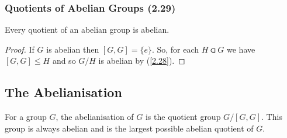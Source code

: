 \subsubsection{Quotients of Abelian Groups (2.29)} \label{2.29}

Every quotient of an abelian group is abelian.

\begin{proof}
    If $G$ is abelian then $[G, G] = \{e\}$. So, for each $H \csub G$
    we have $[G, G] \leq H$ and so $G / H$ is abelian by (\ref{2.28}).
\end{proof}

\subsection{The Abelianisation}

For a group $G$, the abelianisation of $G$ is the quotient group 
$G/[G, G]$. This group is always abelian and is the largest possible
abelian quotient of $G$.
